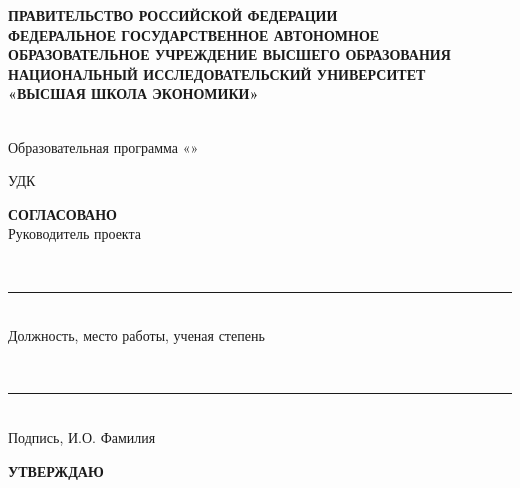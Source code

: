 %
\begin{titlepage}
\thispagestyle{empty}
\singlespacing
\footnotesize
\setlength{\parindent}{0pt}
\setlength{\parskip}{0pt}

\begin{center}
\textbf{ПРАВИТЕЛЬСТВО РОССИЙСКОЙ ФЕДЕРАЦИИ}\\
\textbf{ФЕДЕРАЛЬНОЕ ГОСУДАРСТВЕННОЕ АВТОНОМНОЕ}\\
\textbf{ОБРАЗОВАТЕЛЬНОЕ УЧРЕЖДЕНИЕ ВЫСШЕГО ОБРАЗОВАНИЯ}\\
\textbf{НАЦИОНАЛЬНЫЙ ИССЛЕДОВАТЕЛЬСКИЙ УНИВЕРСИТЕТ}\\
\textbf{«ВЫСШАЯ ШКОЛА ЭКОНОМИКИ»}

\vspace{0.35cm}
\hseFaculty\\
Образовательная программа «\hseSpecialization»
\end{center}

\vspace{0.25cm}
\noindent
УДК~\hseUDC

\vspace{0.4cm}
\noindent
\begin{minipage}[t]{0.46\textwidth}
\raggedright
\textbf{СОГЛАСОВАНО}\\
Руководитель проекта

\vspace{0.15cm}
\strut\hseSupervisorTitle\\[-0.05cm]
\rule{6cm}{0.4pt}\\[-0.05cm]
{\scriptsize Должность, место работы, ученая степень}

\vspace{0.12cm}
\strut\hseSupervisorName\\[-0.05cm]
\rule{6cm}{0.4pt}\\[-0.05cm]
{\scriptsize Подпись, И.О. Фамилия}

\vspace{0.1cm}
\signdateblank
\end{minipage}
\hfill
\begin{minipage}[t]{0.46\textwidth}
\raggedright
\textbf{УТВЕРЖДАЮ}\\
\strut\hseAcademicSupervisorTitle


\end{minipage}
\end{titlepage}
